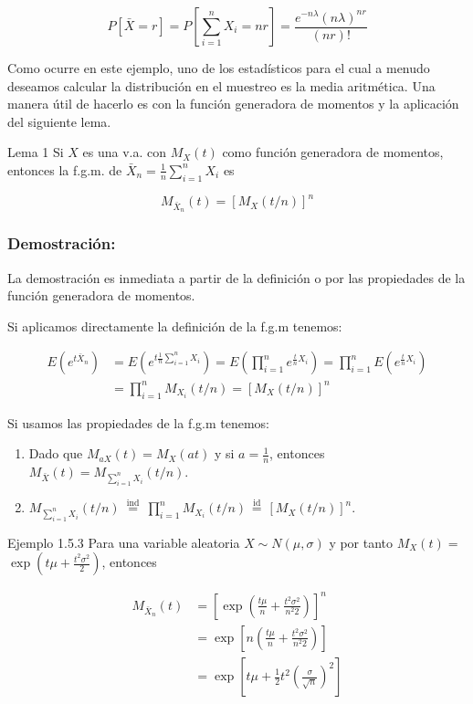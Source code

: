 \documentclass[
]{article}
\providecommand{\tightlist}{%
  \setlength{\itemsep}{0pt}\setlength{\parskip}{0pt}}
\begin{document}
\[
P[\bar{X}=r]=P\left[\sum_{i=1}^{n} X_{i}=n r\right]=\frac{e^{-n \lambda}(n \lambda)^{n r}}{(n r)!}
\]

Como ocurre en este ejemplo, uno de los estadísticos para el cual a menudo deseamos calcular la distribución en el muestreo es la media aritmética. Una manera útil de hacerlo es con la función generadora de momentos y la aplicación del siguiente lema.

Lema 1 Si \(X\) es una v.a. con \(M_{X}(t)\) como función generadora de momentos, entonces la f.g.m. de \(\bar{X}_{n}=\frac{1}{n} \sum_{i=1}^{n} X_{i}\) es

\[
M_{\bar{X}_{n}}(t)=\left[M_{X}(t / n)\right]^{n}
\]

\subsubsection{Demostración:}\label{demostraciuxf3n}

La demostración es inmediata a partir de la definición o por las propiedades de la función generadora de momentos.

Si aplicamos directamente la definición de la f.g.m tenemos:

\[
\begin{aligned}
E\left(e^{t \bar{X}_{n}}\right) & =E\left(e^{t \frac{1}{n} \sum_{i=1}^{n} X_{i}}\right)=E\left(\prod_{i=1}^{n} e^{\frac{t}{n} X_{i}}\right)=\prod_{i=1}^{n} E\left(e^{\frac{t}{n} X_{i}}\right) \\
& =\prod_{i=1}^{n} M_{X_{i}}(t / n)=\left[M_{X}(t / n)\right]^{n}
\end{aligned}
\]

Si usamos las propiedades de la f.g.m tenemos:

\begin{enumerate}
\def\labelenumi{\arabic{enumi}.}
\tightlist
\item
  Dado que \(M_{a X}(t)=M_{X}(a t)\) y si \(a=\frac{1}{n}\), entonces \(M_{\bar{X}}(t)=M_{\sum_{i=1}^{n} X_{i}}(t / n)\).
\item
  \(M_{\sum_{i=1}^{n} X_{i}}(t / n) \stackrel{\text { ind }}{=} \prod_{i=1}^{n} M_{X_{i}}(t / n) \stackrel{\text { id }}{=}\left[M_{X}(t / n)\right]^{n}\).
\end{enumerate}

Ejemplo 1.5.3 Para una variable aleatoria \(X \sim N(\mu, \sigma)\) y por tanto \(M_{X}(t)=\) \(\exp \left(t \mu+\frac{t^{2} \sigma^{2}}{2}\right)\), entonces

\[
\begin{aligned}
M_{\bar{X}_{n}}(t) & =\left[\exp \left(\frac{t \mu}{n}+\frac{t^{2} \sigma^{2}}{n^{2} 2}\right)\right]^{n} \\
& =\exp \left[n\left(\frac{t \mu}{n}+\frac{t^{2} \sigma^{2}}{n^{2} 2}\right)\right] \\
& =\exp \left[t \mu+\frac{1}{2} t^{2}\left(\frac{\sigma}{\sqrt{n}}\right)^{2}\right]
\end{aligned}
\]
\end{document}
